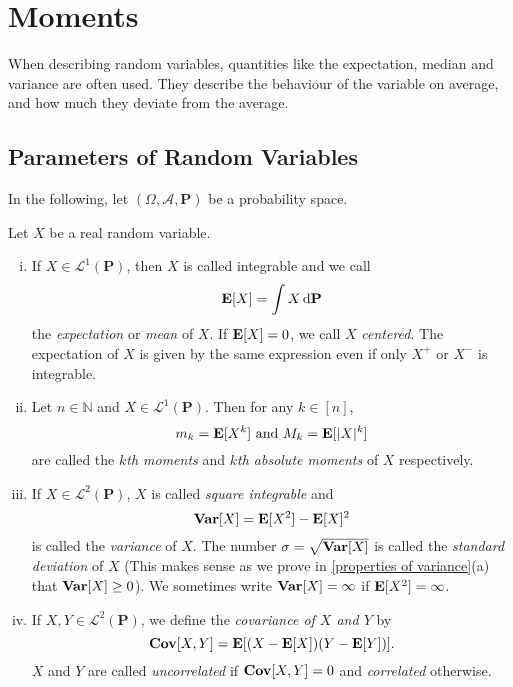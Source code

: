 \section{Moments}

When describing random variables, quantities like the expectation, median and variance are often used. They describe the behaviour of the variable on average, and how much they deviate from the average.

\subsection{Parameters of Random Variables}

In the following, let $(\Omega,\mathcal{A},\textbf{P})$ be a probability space.

\begin{definition}
    Let $X$ be a real random variable.
    \begin{enumerate}[(i)]
        \item If $X\in\mathcal{L}^1(\textbf{P})$, then $X$ is called integrable and we call
        $$\textbf{E}[X]=\int X\operatorname{d}\!{\textbf{P}}$$
        the \textit{expectation} or \textit{mean} of $X$. If $\textbf{E}[X]=0$, we call $X$ \textit{centered}. The expectation of $X$ is given by the same expression even if only $X^+$ or $X^-$ is integrable.
        
        \item Let $n\in\mathbb{N}$ and $X\in\mathcal{L}^1(\textbf{P})$. Then for any $k\in [n]$,
        $$m_k=\textbf{E}[X^k]\text{ and }M_k=\textbf{E}[|X|^k]$$
        are called the \textit{$k$th moments} and \textit{$k$th absolute moments} of $X$ respectively.
        
        \item If $X\in\mathcal{L}^2(\textbf{P})$, $X$ is called \textit{square integrable} and
        $$\operatorname{\textbf{Var}}[X]=\textbf{E}[X^2]-\textbf{E}[X]^2$$
        is called the \textit{variance} of $X$. The number $\sigma=\sqrt{\operatorname{\textbf{Var}}[X]}$ is called the \textit{standard deviation} of $X$ (This makes sense as we prove in \cref{properties of variance}(a) that $\operatorname{\textbf{Var}}[X]\geq 0$). We sometimes write $\operatorname{\textbf{Var}}[X]=\infty$ if $\textbf{E}[X^2]=\infty$.
        
        \item If $X,Y\in\mathcal{L}^2(\textbf{P})$, we define the \textit{covariance of $X$ and $Y$} by
        $$\operatorname{\textbf{Cov}}[X,Y]=\textbf{E}[(X-\textbf{E}[X])(Y-\textbf{E}[Y])].$$
        $X$ and $Y$ are called \textit{uncorrelated} if $\operatorname{\textbf{Cov}}[X,Y]=0$ and \textit{correlated} otherwise.
    \end{enumerate}
\end{definition}

